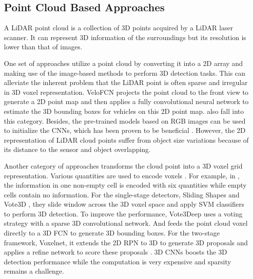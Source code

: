 \documentclass[a4paper,12pt]{article}
\begin{document}
\subsection{Point Cloud Based Approaches}

A LiDAR point cloud is a collection of 3D points acquired by a LiDAR laser scanner. It can represent 3D information of the surroundings but its resolution is lower than that of images.

One set of approaches utilize a point cloud by converting it into a 2D array and making use of the image-based methods to perform 3D detection tasks. This can alleviate the inherent problem that the LiDAR point is often sparse and irregular in 3D voxel representation. VeloFCN \cite{DBLP:journals/corr/LiZX16} projects the point cloud to the front view to generate a 2D point map and then applies a fully convolutional neural network to estimate the 3D bounding boxes for vehicles on this 2D point map. \cite{DBLP:journals/corr/abs-1710-07368, Chen:2015:OPA:2969239.2969287} also fall into this category. Besides, the pre-trained models based on RGB images can be used to initialize the CNNs, which has been proven to be beneficial \cite{DBLP:journals/corr/GuptaGAM14}. However, the 2D representation of LiDAR cloud points suffer from object size variations because of its distance to the sensor and object overlapping.

Another category of approaches transforms the cloud point into a 3D voxel grid representation. Various quantities are used to encode voxels \cite{10.1007/978-3-319-10599-4_41, 7780463, DBLP:journals/corr/Li16p, Wang-RSS-15, DBLP:journals/corr/EngelckeRWTP16}. For example, in \cite{Wang-RSS-15, DBLP:journals/corr/EngelckeRWTP16}, the information in one non-empty cell is encoded with six quantities while empty cells contain no information. For the single-stage detectors, \eg Sliding Shapes \cite{10.1007/978-3-319-10599-4_41} and Vote3D \cite{Wang-RSS-15}, they slide window across the 3D voxel space and apply SVM classifiers to perform 3D detection. To improve the performance, Vote3Deep \cite{DBLP:journals/corr/EngelckeRWTP16} uses a voting strategy with a sparse 3D convolutional network. And \cite{DBLP:journals/corr/Li16p} feeds the point cloud voxel directly to a 3D FCN to generate 3D bounding boxes. For the two-stage framework, \eg Voxelnet, it extends the 2D RPN \cite{DBLP:journals/corr/RenHG015} to 3D to generate 3D proposals and  applies a refine network to score these proposals \cite{DBLP:journals/corr/abs-1711-06396}. 3D CNNs boosts the 3D detection performance while the computation is very expensive and sparsity remains a challenge.  
\end{document}
